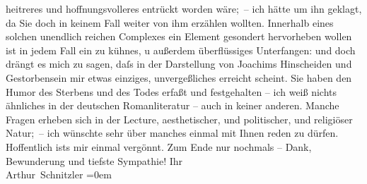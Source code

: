 \begin{ledgroupsized}[t]{13cm}
               heitreres und hoffnungsvolleres entrückt worden wäre; – ich hätte um ihn geklagt, da
               Sie doch in keinem Fall weiter von ihm erzählen wollten. Innerhalb {\pb}eines solchen unendlich reichen Complexes ein Element gesondert hervorheben wollen
               ist in jedem Fall ein zu kühnes, u außerdem überflüssiges Unterfangen: und doch
               drängt es mich zu sagen, daſs in der Darstellung von Joachims Hinscheiden und Gestorbensein mir etwas einziges,
               unvergeßliches erreicht scheint. Sie haben den Humor des Sterbens und des Todes
               erfaßt und festgehalten – ich weiß nichts ähnliches in der deutschen Romanliteratur –
               auch in keiner anderen.\pend
           \pstart
           Manche Fragen erheben sich in der Lecture, aesthetischer, und politischer, und
               religiöser Natur; – ich wünschte sehr über manches einmal mit Ihnen reden zu dürfen.
               Hoffentlich ists mir einmal vergönnt. Zum Ende nur nochmals – Dank, Bewunderung und
               tiefste Sympathie!\pend
           \pstart
           Ihr{\\[\baselineskip]}\spacefill\mbox{Arthur Schnitzler}\pend
           \leftskip=0em{}\endnumbering{}\end{ledgroupsized}  \newcommand{\dateiname}{L02429}\newcommand{\titel}{Arthur Schnitzler an Thomas Mann, 5. 1. 1925}\newcommand{\editorInnen}{Martin Anton Müller und Gerd-Hermann Susen}
      